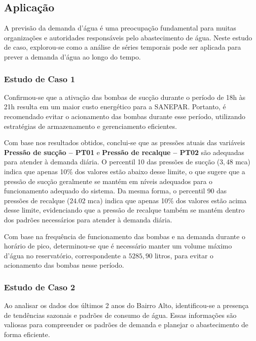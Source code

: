 \subsection{Aplica\c c\~ao}\label{subsec:estudo-reslt}

A previsão da demanda d'água é uma preocupação fundamental para muitas organizações e autoridades responsáveis pelo abastecimento de água. Neste estudo de caso, explorou-se como a análise de séries temporais pode ser aplicada para prever a demanda d'água ao longo do tempo.

\subsubsection{Estudo de Caso 1}\label{subsubsec:quest-est}

Confirmou-se que a ativação das bombas de sucção durante o período de 18h às 21h resulta em um maior custo energético para a SANEPAR. Portanto, é recomendado evitar o acionamento das bombas durante esse período, utilizando estratégias de armazenamento e gerenciamento eficientes.

Com base nos resultados obtidos, conclui-se que as pressões atuais das variáveis \textbf{Pressão de sucção -- PT01} e \textbf{Pressão de recalque -- PT02} são adequadas para atender à demanda diária. O percentil 10 das pressões de sucção ($3,48$ mca) indica que apenas 10\% dos valores estão abaixo desse limite, o que sugere que a pressão de sucção geralmente se mantém em níveis adequados para o funcionamento adequado do sistema. Da mesma forma, o percentil 90 das pressões de recalque ($24.02$ mca) indica que apenas 10\% dos valores estão acima desse limite, evidenciando que a pressão de recalque também se mantém dentro dos padrões necessários para atender à demanda diária.


Com base na frequência de funcionamento das bombas e na demanda durante o horário de pico, determinou-se que é necessário manter um volume máximo d'água no reservatório, correspondente a $5285,90$ litros, para evitar o acionamento das bombas nesse período.

\subsubsection{Estudo de Caso 2}

Ao analisar os dados dos últimos 2 anos do Bairro Alto, identificou-se a presença de tendências sazonais e padrões de consumo de água. Essas informações são valiosas para compreender os padrões de demanda e planejar o abastecimento de forma eficiente.

